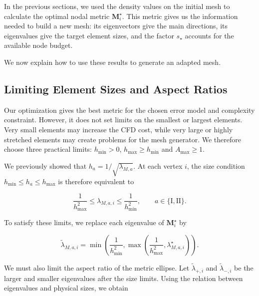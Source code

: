 \documentclass[11pt,a4paper]{article}
\begin{document}
\noindent In the previous sections, we used the density values
on the initial mesh to calculate the optimal nodal metric
$\mathbf M_i^\star$. This metric gives us the information needed
to build a new mesh: its eigenvectors give the main directions,
its eigenvalues give the target element sizes, and the factor
$s_\star$ accounts for the available node budget.

\noindent We now explain how to use these results to generate
an adapted mesh.

\subsection{Limiting Element Sizes and Aspect Ratios}

\noindent Our optimization gives the best metric for the chosen
error model and complexity constraint. However, it does not
set limits on the smallest or largest elements. Very small
elements may increase the CFD cost, while very large or highly
stretched elements may create problems for the mesh generator.
We therefore choose three practical limits:
$h_{\min}>0$, $h_{\max}\geq h_{\min}$ and $A_{\max}\geq1$.

\medskip

\noindent We previously showed that $h_a=1/\sqrt{\lambda_{M,a}}$.
At each vertex $i$, the size condition
$h_{\min}\leq h_a\leq h_{\max}$ is therefore equivalent to

\begin{equation}
    \label{eq:metric_eigenvalue_bounds}
    \boxed{
    \frac{1}{h_{\max}^2}
    \leq\lambda_{M,a,i}
    \leq\frac{1}{h_{\min}^2},
    \qquad a\in\{\mathrm I,\mathrm{II}\}.
    }
\end{equation}

\noindent To satisfy these limits, we replace each eigenvalue
of $\mathbf M_i^\star$ by

\begin{equation}
    \label{eq:clipped_metric_eigenvalues}
    \widetilde\lambda_{M,a,i}
    =\min\!\left(\frac{1}{h_{\min}^2},
    \max\!\left(\frac{1}{h_{\max}^2},
    \lambda_{M,a,i}^\star\right)\right).
\end{equation}

\noindent We must also limit the aspect ratio of the metric ellipse.
Let $\widetilde\lambda_{+,i}$ and $\widetilde\lambda_{-,i}$
be the larger and smaller eigenvalues after the size limits.
Using the relation between eigenvalues and physical sizes,
we obtain
\end{document}
